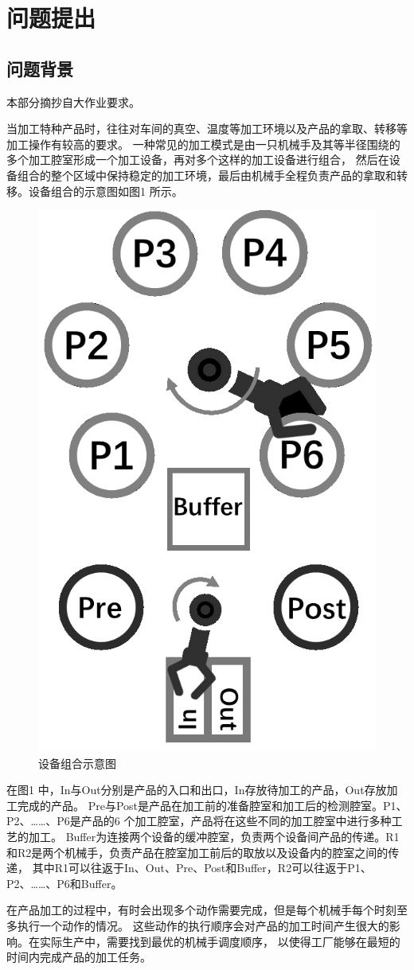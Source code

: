 \documentclass{ctexart}
\begin{document}
\section{问题提出}
{
    \subsection{问题背景}
    {
        本部分摘抄自大作业要求。

        当加工特种产品时，往往对车间的真空、温度等加工环境以及产品的拿取、转移等加工操作有较高的要求。
        一种常见的加工模式是由一只机械手及其等半径围绕的多个加工腔室形成一个加工设备，再对多个这样的加工设备进行组合，
        然后在设备组合的整个区域中保持稳定的加工环境，最后由机械手全程负责产品的拿取和转移。设备组合的示意图如图1 所示。

        \begin{figure}[H]
            \centering
            \includegraphics[width = 0.4\linewidth]{pic0.png}
            \caption{设备组合示意图}
        \end{figure}

        在图1 中，In与Out分别是产品的入口和出口，In存放待加工的产品，Out存放加工完成的产品。
        Pre与Post是产品在加工前的准备腔室和加工后的检测腔室。P1、P2、……、P6是产品的6 个加工腔室，产品将在这些不同的加工腔室中进行多种工艺的加工。
        Buffer为连接两个设备的缓冲腔室，负责两个设备间产品的传递。R1 和R2是两个机械手，负责产品在腔室加工前后的取放以及设备内的腔室之间的传递，
        其中R1可以往返于In、Out、Pre、Post和Buffer，R2可以往返于P1、P2、……、P6和Buffer。
        
        在产品加工的过程中，有时会出现多个动作需要完成，但是每个机械手每个时刻至多执行一个动作的情况。
        这些动作的执行顺序会对产品的加工时间产生很大的影响。在实际生产中，需要找到最优的机械手调度顺序，
        以使得工厂能够在最短的时间内完成产品的加工任务。
        
}}
\end{document}
